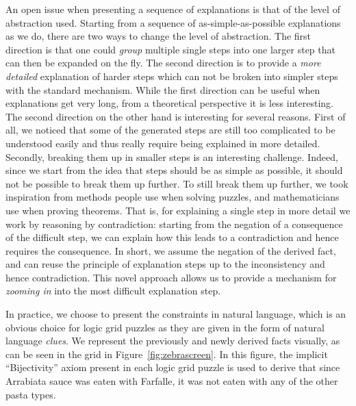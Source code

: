 An open issue when presenting a sequence of explanations is that of the level of abstraction used.
Starting from a sequence of as-simple-as-possible explanations as we do, there are two ways to change the level of abstraction.
The first direction is that one could \emph{group} multiple single steps into one larger step that can then be expanded on the fly. 
The second direction is to provide a \emph{more detailed} explanation of harder steps which can not be broken into simpler steps with the standard mechanism.
While the first direction can be useful when explanations get very long, from a theoretical perspective it is less interesting. 
The second direction on the other hand is interesting for several reasons. First of all, we noticed that some of the generated steps are still too complicated to be understood easily and thus really require being explained in more detailed. Secondly, breaking them up in smaller steps is an interesting challenge. Indeed, since we start from the idea that steps should be as simple as possible, it should not be possible to break them up further. 
To still break them up further, we took inspiration from methods people use when solving puzzles, and mathematicians use when proving theorems. 
That is, for explaining a single step in more detail we work by reasoning by contradiction: starting from the negation of a consequence of the difficult step, we can explain how this leads to a contradiction and hence requires the consequence. In short, we assume the negation of the derived fact, and can reuse the principle of explanation steps up to the inconsistency and hence contradiction. 
This novel approach allows us to provide a mechanism for \emph{zooming in} into the most difficult explanation step.

In practice, we choose to present the constraints in natural language, which is an obvious choice for logic grid puzzles as they are given in the form of natural language \textit{clues}. 
We represent the previously and newly derived facts visually, as can be seen in the grid in Figure~\ref{fig:zebrascreen}. In this figure, the implicit ``Bijectivity'' axiom present in each logic grid puzzle is used to derive that since Arrabiata sauce was eaten with Farfalle, it was not eaten with any of the other pasta types.

